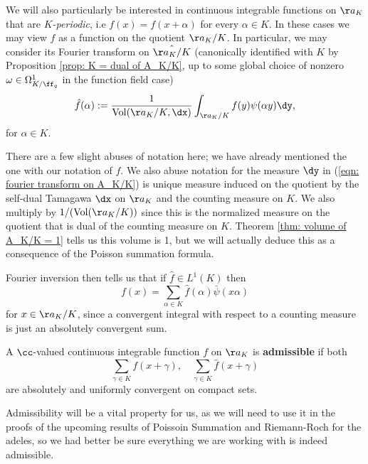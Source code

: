 \documentclass[11pt, x11names, openany]{book}
\begin{document}
We will also particularly be interested in continuous integrable functions on $\aa_K$ that are \textit{$K$-periodic}, i.e $f(x) = f(x + \alpha)$ for every $\alpha \in K$. In these cases we may view $f$ as a function on the quotient $\aa_K/K$. In particular, we may consider its Fourier transform on $ \hat{\aa_K/K}$ (canonically identified with $K$ by Proposition \ref{prop: K = dual of A_K/K}, up to some global choice of nonzero $\omega \in \Omega^1_{K/\ff_q}$ in the function field case)
\begin{equation}
    \label{eqn: fourier transform on A_K/K}
    \hat{f}(\alpha) := \frac{1}{\vol(\aa_K/K, \dx)} \int_{\aa_K/K} f(y) \psi(\alpha y) \dy,
\end{equation}
for $\alpha \in K$.
\begin{warning}
    There are a few slight abuses of notation here; we have already mentioned the one with our notation of $f$. We also abuse notation for the measure $\dy$ in (\ref{eqn: fourier transform on A_K/K}) is unique measure induced on the quotient by the self-dual Tamagawa $\dx$ on $\aa_K$ and the counting measure on $K$. We also multiply by $1/(\vol(\aa_K/K))$ since this is the normalized measure on the quotient that is dual of the counting measure on $K$. Theorem \ref{thm: volume of A_K/K = 1} tells us this volume is 1, but we will actually deduce this as a consequence of the Poisson summation formula. 
\end{warning}
Fourier inversion then tells us that if $\hat{f} \in L^1(K)$ then
\begin{equation*}
    f(x) = \sum_{\alpha \in K} \hat{f}(\alpha) \bar{\psi}(x \alpha)
\end{equation*}
for $x \in \aa_K/K$, since a convergent integral with respect to a counting measure is just an absolutely convergent sum.
\begin{defn}
A $\cc$-valued continuous integrable function $f$ on $\aa_K$ is \textbf{admissible} if both
\begin{equation*}
    \sum_{\gamma \in K} f(x + \gamma), \quad \sum_{\gamma \in K} \hat{f}(x + \gamma)
\end{equation*}
are absolutely and uniformly convergent on compact sets.
\end{defn}

Admissibility will be a vital property for us, as we will need to use it in the proofs of the upcoming results of Poissoin Summation and Riemann-Roch for the adeles, so we had better be sure everything we are working with is indeed admissible.
\end{document}
